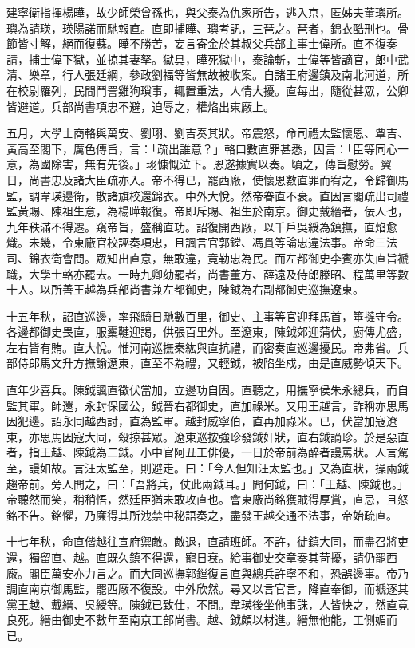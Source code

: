 \begin{pinyinscope}
建寧衛指揮楊曄，故少師榮曾孫也，與父泰為仇家所告，逃入京，匿姊夫董璵所。璵為請瑛，瑛陽諾而馳報直。直即捕曄、璵考訊，三琶之。琶者，錦衣酷刑也。骨節皆寸解，絕而復蘇。曄不勝苦，妄言寄金於其叔父兵部主事士偉所。直不復奏請，捕士偉下獄，並掠其妻孥。獄具，曄死獄中，泰論斬，士偉等皆謫官，郎中武清、樂章，行人張廷綱，參政劉福等皆無故被收案。自諸王府邊鎮及南北河道，所在校尉羅列，民間鬥詈雞狗瑣事，輒置重法，人情大擾。直每出，隨從甚眾，公卿皆避道。兵部尚書項忠不避，迫辱之，權焰出東廠上。

五月，大學士商輅與萬安、劉珝、劉吉奏其狀。帝震怒，命司禮太監懷恩、覃吉、黃高至閣下，厲色傳旨，言：「疏出誰意？」輅口數直罪甚悉，因言：「臣等同心一意，為國除害，無有先後。」珝慷慨泣下。恩遂據實以奏。頃之，傳旨慰勞。翼日，尚書忠及諸大臣疏亦入。帝不得已，罷西廠，使懷恩數直罪而宥之，令歸御馬監，調韋瑛邊衛，散諸旗校還錦衣。中外大悅。然帝眷直不衰。直因言閣疏出司禮監黃賜、陳祖生意，為楊曄報復。帝即斥賜、祖生於南京。御史戴縉者，佞人也，九年秩滿不得遷。窺帝旨，盛稱直功。詔復開西廠，以千戶吳綬為鎮撫，直焰愈熾。未幾，令東廠官校誣奏項忠，且諷言官郭鏜、馮貫等論忠違法事。帝命三法司、錦衣衛會問。眾知出直意，無敢違，竟勒忠為民。而左都御史李賓亦失直旨褫職，大學士輅亦罷去。一時九卿劾罷者，尚書董方、薛遠及侍郎滕昭、程萬里等數十人。以所善王越為兵部尚書兼左都御史，陳鉞為右副都御史巡撫遼東。

十五年秋，詔直巡邊，率飛騎日馳數百里，御史、主事等官迎拜馬首，箠撻守令。各邊都御史畏直，服櫜鞬迎謁，供張百里外。至遼東，陳鉞郊迎蒲伏，廚傳尤盛，左右皆有賄。直大悅。惟河南巡撫秦紘與直抗禮，而密奏直巡邊擾民。帝弗省。兵部侍郎馬文升方撫諭遼東，直至不為禮，又輕鉞，被陷坐戍，由是直威勢傾天下。

直年少喜兵。陳鉞諷直徵伏當加，立邊功自固。直聽之，用撫寧侯朱永總兵，而自監其軍。師還，永封保國公，鉞晉右都御史，直加祿米。又用王越言，詐稱亦思馬因犯邊。詔永同越西討，直為監軍。越封威寧伯，直再加祿米。已，伏當加寇遼東，亦思馬因寇大同，殺掠甚眾。遼東巡按強珍發鉞奸狀，直右鉞謫珍。於是惡直者，指王越、陳鉞為二鉞。小中官阿丑工俳優，一日於帝前為醉者謾罵狀。人言駕至，謾如故。言汪太監至，則避走。曰：「今人但知汪太監也。」又為直狀，操兩鉞趨帝前。旁人問之，曰：「吾將兵，仗此兩鉞耳。」問何鉞，曰：「王越、陳鉞也。」帝聽然而笑，稍稍悟，然廷臣猶未敢攻直也。會東廠尚銘獲賊得厚賞，直忌，且怒銘不告。銘懼，乃廉得其所洩禁中秘語奏之，盡發王越交通不法事，帝始疏直。

十七年秋，命直偕越往宣府禦敵。敵退，直請班師。不許，徙鎮大同，而盡召將吏還，獨留直、越。直既久鎮不得還，寵日衰。給事御史交章奏其苛擾，請仍罷西廠。閣臣萬安亦力言之。而大同巡撫郭鏜復言直與總兵許寧不和，恐誤邊事。帝乃調直南京御馬監，罷西廠不復設。中外欣然。尋又以言官言，降直奉御，而褫逐其黨王越、戴縉、吳綬等。陳鉞已致仕，不問。韋瑛後坐他事誅，人皆快之，然直竟良死。縉由御史不數年至南京工部尚書。越、鉞頗以材進。縉無他能，工側媚而已。


\end{pinyinscope}

